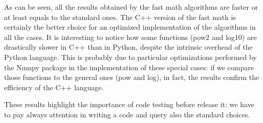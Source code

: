 \documentclass{standalone}
\begin{document}
As can be seen, all the results obtained by the \textsf{fast math} algorithms are faster or at least equals to the standard ones.
The \textsf{C++} version of the \textsf{fast math} is certainly the better choice for an optimized implementation of the algorithms in all the cases.
It is interesting to notice how some functions (\textsf{pow2} and \textsf{log10}) are drastically slower in \textsf{C++} than in \textsf{Python}, despite the intrinsic overhead of the \textsf{Python} language.
This is probably due to particular optimizations performed by the \textsf{Numpy} package in the implementation of these special cases: if we compare those functions to the general ones (\textsf{pow} and \textsf{log}), in fact, the results confirm the efficiency of the \textsf{C++} language.

These results highlight the importance of code testing before release it: we have to pay always attention in writing a code and query also the standard choices.
\end{document}
